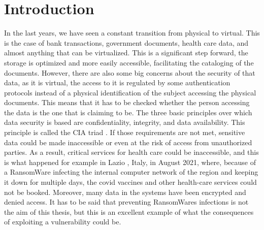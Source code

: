 \chapter{Introduction}
\label{chap:introduction}
In the last years, we have seen a constant transition from physical to virtual. This is the case of bank transactions, government documents, health care data, and almost anything that can be virtualized. This is a significant step forward, the storage is optimized and more easily accessible, facilitating the cataloging of the documents. However, there are also some big concerns about the security of that data, as it is virtual, the access to it is regulated by some authentication protocols instead of a physical identification of the subject accessing the physical documents. This means that it has to be checked whether the person accessing the data is the one that is claiming to be. The three basic principles over which data security is based are confidentiality, integrity, and data availability. This principle is called the CIA triad \cite{cia_triad}.
If those requirements are not met, sensitive data could be made inaccessible or even at the risk of access from unauthorized parties. As a result, critical services for health care could be inaccessible, and this is what happened for example in Lazio \cite{lazio_hacker_0,lazio_hacker_1}, Italy, in August 2021, where, because of a RansomWare infecting the internal computer network of the region and keeping it down for multiple days, the covid vaccines and other health-care services could not be booked. Moreover, many data in the systems have been encrypted and denied access. It has to be said that preventing RansomWares infections is not the aim of this thesis, but this is an excellent example of what the consequences of exploiting a vulnerability could be. 

